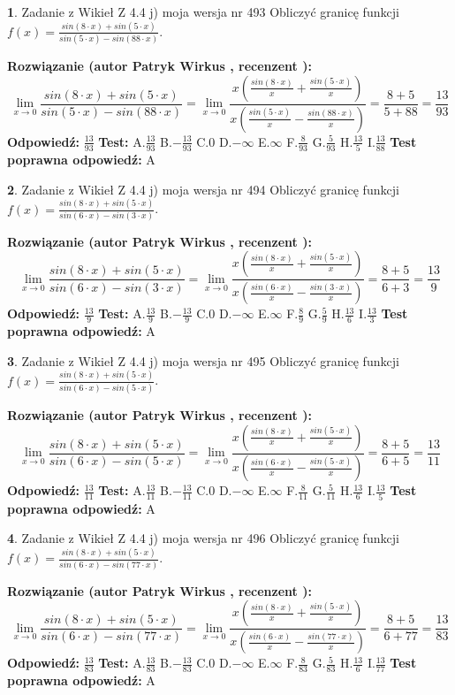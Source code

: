 \documentclass[12pt, a4paper]{article}
\theoremstyle{definition} %
\newtheorem{zad}{}
\newcommand{\zadStart}[1]{\begin{zad}#1\newline}
\newcommand{\zadStop}{\end{zad}}
\newcommand{\rozwStart}[2]{\noindent \textbf{Rozwiązanie (autor #1 , recenzent #2): }\newline}
\newcommand{\rozwStop}{\newline}
\newcommand{\odpStart}{\noindent \textbf{Odpowiedź:}\newline}
\newcommand{\odpStop}{\newline}
\newcommand{\testStart}{\noindent \textbf{Test:}\newline}
\newcommand{\testStop}{\newline}
\newcommand{\kluczStart}{\noindent \textbf{Test poprawna odpowiedź:}\newline}
\newcommand{\kluczStop}{\newline}
\begin{document}
\zadStart{Zadanie z Wikieł Z 4.4 j) moja wersja nr 493}
Obliczyć granicę funkcji $f(x)=\frac{sin(8\cdot x) +sin(5\cdot x)}{sin(5\cdot x) -sin(88\cdot x)}$.
\zadStop
\rozwStart{Patryk Wirkus}{}
$$\lim\limits_{x\to 0}\frac{sin(8\cdot x) +sin(5\cdot x)}{sin(5\cdot x) -sin(88\cdot x)}=\lim\limits_{x\to 0}\frac{x(\frac{sin(8\cdot x)}{x}+\frac{sin(5\cdot x)}{x})}{x(\frac{sin(5\cdot x)}{x}-\frac{sin(88\cdot x)}{x})}=\frac{8+5}{5+88} = \frac{13}{93}$$
\rozwStop
\odpStart
$\frac{13}{93}$
\odpStop
\testStart
A.$\frac{13}{93}$
B.$-\frac{13}{93}$
C.$0$
D.$-\infty$
E.$\infty$
F.$\frac{8}{93}$
G.$\frac{5}{93}$
H.$\frac{13}{5}$
I.$\frac{13}{88}$
\testStop
\kluczStart
A
\kluczStop



\zadStart{Zadanie z Wikieł Z 4.4 j) moja wersja nr 494}
Obliczyć granicę funkcji $f(x)=\frac{sin(8\cdot x) +sin(5\cdot x)}{sin(6\cdot x) -sin(3\cdot x)}$.
\zadStop
\rozwStart{Patryk Wirkus}{}
$$\lim\limits_{x\to 0}\frac{sin(8\cdot x) +sin(5\cdot x)}{sin(6\cdot x) -sin(3\cdot x)}=\lim\limits_{x\to 0}\frac{x(\frac{sin(8\cdot x)}{x}+\frac{sin(5\cdot x)}{x})}{x(\frac{sin(6\cdot x)}{x}-\frac{sin(3\cdot x)}{x})}=\frac{8+5}{6+3} = \frac{13}{9}$$
\rozwStop
\odpStart
$\frac{13}{9}$
\odpStop
\testStart
A.$\frac{13}{9}$
B.$-\frac{13}{9}$
C.$0$
D.$-\infty$
E.$\infty$
F.$\frac{8}{9}$
G.$\frac{5}{9}$
H.$\frac{13}{6}$
I.$\frac{13}{3}$
\testStop
\kluczStart
A
\kluczStop



\zadStart{Zadanie z Wikieł Z 4.4 j) moja wersja nr 495}
Obliczyć granicę funkcji $f(x)=\frac{sin(8\cdot x) +sin(5\cdot x)}{sin(6\cdot x) -sin(5\cdot x)}$.
\zadStop
\rozwStart{Patryk Wirkus}{}
$$\lim\limits_{x\to 0}\frac{sin(8\cdot x) +sin(5\cdot x)}{sin(6\cdot x) -sin(5\cdot x)}=\lim\limits_{x\to 0}\frac{x(\frac{sin(8\cdot x)}{x}+\frac{sin(5\cdot x)}{x})}{x(\frac{sin(6\cdot x)}{x}-\frac{sin(5\cdot x)}{x})}=\frac{8+5}{6+5} = \frac{13}{11}$$
\rozwStop
\odpStart
$\frac{13}{11}$
\odpStop
\testStart
A.$\frac{13}{11}$
B.$-\frac{13}{11}$
C.$0$
D.$-\infty$
E.$\infty$
F.$\frac{8}{11}$
G.$\frac{5}{11}$
H.$\frac{13}{6}$
I.$\frac{13}{5}$
\testStop
\kluczStart
A
\kluczStop



\zadStart{Zadanie z Wikieł Z 4.4 j) moja wersja nr 496}
Obliczyć granicę funkcji $f(x)=\frac{sin(8\cdot x) +sin(5\cdot x)}{sin(6\cdot x) -sin(77\cdot x)}$.
\zadStop
\rozwStart{Patryk Wirkus}{}
$$\lim\limits_{x\to 0}\frac{sin(8\cdot x) +sin(5\cdot x)}{sin(6\cdot x) -sin(77\cdot x)}=\lim\limits_{x\to 0}\frac{x(\frac{sin(8\cdot x)}{x}+\frac{sin(5\cdot x)}{x})}{x(\frac{sin(6\cdot x)}{x}-\frac{sin(77\cdot x)}{x})}=\frac{8+5}{6+77} = \frac{13}{83}$$
\rozwStop
\odpStart
$\frac{13}{83}$
\odpStop
\testStart
A.$\frac{13}{83}$
B.$-\frac{13}{83}$
C.$0$
D.$-\infty$
E.$\infty$
F.$\frac{8}{83}$
G.$\frac{5}{83}$
H.$\frac{13}{6}$
I.$\frac{13}{77}$
\testStop
\kluczStart
A
\kluczStop
\end{document}
